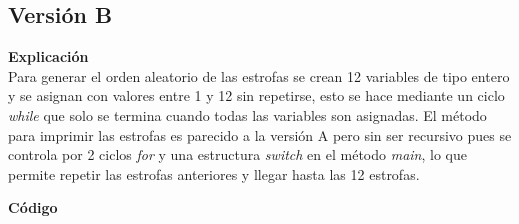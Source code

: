 \documentclass[11pt, twocolumn]{article}
\begin{document}
  \subsection*{Versión B} 
  
  \textbf{Explicación} \\
  Para generar el orden aleatorio de las estrofas se crean 12 variables de tipo entero y se asignan con valores entre 1 y 12 sin repetirse, esto se hace mediante un ciclo \textit{while} que solo se termina cuando todas las variables son asignadas. El método para imprimir las estrofas es parecido a la versión A pero sin ser recursivo pues se controla por 2 ciclos \textit{for} y una estructura \textit{switch} en el método \textit{main}, lo que permite repetir las estrofas anteriores y llegar hasta las 12 estrofas.
  
  \textbf{Código}
\end{document}
